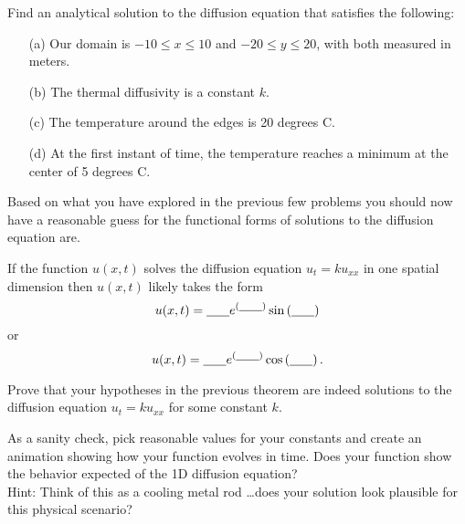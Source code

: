 \begin{problem}
    Find an analytical solution to the diffusion equation that satisfies the following:
    \begin{itemize}
        \item[(a)] Our domain is $-10 \leq x \leq 10$ and $-20 \leq y \leq 20$, with both
            measured in meters.
        \item[(b)] The thermal diffusivity is a constant $k$.
        \item[(c)] The temperature around the edges is 20 degrees C.
        \item[(d)] At the first instant of time, the temperature reaches a minimum at the
            center of 5 degrees C.
    \end{itemize}    
\end{problem}

Based on what you have explored in the previous few problems you should now have a
reasonable guess for the functional forms of solutions to the diffusion equation are.
\begin{thm}
    If the function $u(x,t)$ solves the diffusion equation $u_t = k u_{xx}$ in one spatial
    dimension then $u(x,t)$ likely takes the form
    \[ u(x,t) = \underline{\hspace{0.25in}} e^{(\underline{\hspace{0.25in}})} \sin\left(
    \underline{\hspace{0.25in}} \right) \]
    or
    \[ u(x,t) = \underline{\hspace{0.25in}} e^{(\underline{\hspace{0.25in}})} \cos\left(
    \underline{\hspace{0.25in}} \right). \]
\end{thm}

\begin{problem}
    Prove that your hypotheses in the previous theorem are indeed solutions to the
    diffusion equation $u_t = k u_{xx}$ for some constant $k$.
\end{problem}

\begin{problem}
    As a sanity check, pick reasonable values for your constants and create an animation
    showing how your function evolves in time.  Does your function show the behavior
    expected of the 1D diffusion equation?  \\
    Hint: Think of this as a cooling metal rod \ldots does your solution look
    plausible for this physical scenario?
\end{problem}


